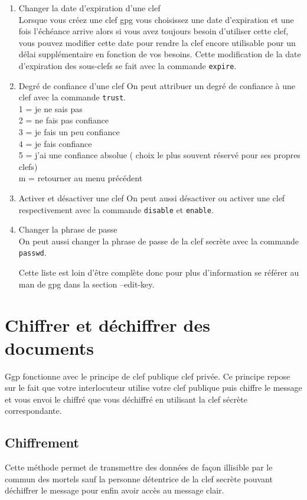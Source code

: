 \begin{enumerate}
\item Changer la date d'expiration d'une clef\\
Lorsque vous créez une clef gpg vous choisissez une date d'expiration et une fois l'échéance arrive alors si vous avez toujours besoin 
d'utiliser cette clef, vous pouvez modifier cette date pour rendre la clef encore utilisable pour un délai supplémentaire
en fonction de vos besoins. Cette modification de la date d'expiration des sous-clefs se fait avec la commande  \texttt{expire}.

\item Degré de confiance d'une clef 
On peut attribuer un degré de confiance à une clef avec la commande \texttt{trust}.\\
  1 = je ne sais pas\\
  2 = ne fais pas confiance\\
  3 = je fais un peu confiance\\
  4 = je fais confiance\\
  5 = j'ai une confiance absolue ( choix le plus souvent réservé pour ses propres clefs)\\
  m = retourner au menu précédent\\
  

\item Activer et désactiver une clef
On peut aussi désactiver ou activer une clef respectivement avec la commande \texttt{disable} et \texttt{enable}.

\item Changer la phrase de passe\\
On peut aussi changer la phrase de passe de la clef secrète avec la commande \texttt{passwd}.


Cette liste est loin d'être complète donc pour plus d'information se référer au man de gpg dans la section --edit-key.\\
\end{enumerate}
\section{Chiffrer et déchiffrer des documents}
  
Ggp fonctionne avec le principe de clef publique clef privée. Ce principe repose sur le fait que votre interlocuteur
utilise votre clef publique puis chiffre le message et vous envoi le chiffré que vous déchiffré en utilisant 
la clef sécrète correspondante.


\subsection {Chiffrement}
Cette méthode permet de transmettre des données de façon illisible par le commun des mortels sauf la personne détentrice de la clef 
secrète pouvant déchiffrer le message pour enfin avoir accès au message clair.\\

